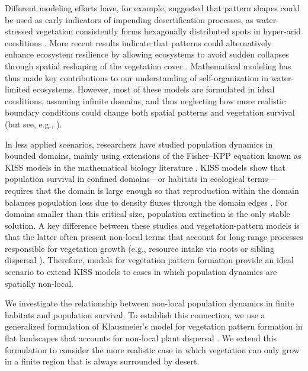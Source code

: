 \documentclass[preprint,12pt]{elsarticle}
\theoremstyle{plain}
\theoremstyle{definition}
\theoremstyle{remark}
\begin{document}
Different modeling efforts have, for example, suggested that pattern shapes could be used as early indicators of impending desertification processes, as water-stressed vegetation consistently forms hexagonally distributed spots in hyper-arid conditions \cite{Lefever1997,VonHardenberg2001,Meron2004,Rietkerk2002}. More recent results indicate that patterns could alternatively enhance ecosystem resilience by allowing ecosystems to avoid sudden collapses through spatial reshaping of the vegetation cover \cite{Rietkerk2021}. Mathematical modeling has thus made key contributions to our understanding of self-organization in water-limited ecosystems. However, most of these models are formulated in ideal conditions, assuming infinite domains, and thus neglecting how more realistic boundary conditions could change both spatial patterns and vegetation survival (but see, e.g., \cite{Clerc2021,PintoRamos2023,PintoRamos2025}).

In less applied scenarios, researchers have studied population dynamics in bounded domains, mainly using extensions of the Fisher–KPP equation \cite{Cantrell1999,Fagan2009,Colombo2018,Dornelas2024} known as KISS models in the mathematical biology literature \cite{Skellam1951,Kierstead1953}. KISS models show that population survival in confined domains---or habitats in ecological terms---requires that the domain is large enough so that reproduction within the domain balances population loss due to density fluxes through the domain edges \cite{Cantrell2004}. For domains smaller than this critical size, population extinction is the only stable solution. A key difference between these studies and vegetation-pattern models is that the latter often present non-local terms that account for long-range processes responsible for vegetation growth (e.g., resource intake via roots or sibling dispersal \cite{Martinez-Garcia2014,Eigentler2018}). Therefore, models for vegetation pattern formation provide an ideal scenario to extend KISS models to cases in which population dynamics are spatially non-local. 

We investigate the relationship between non-local population dynamics in finite habitats and population survival. To establish this connection, we use a generalized formulation of Klausmeier's model for vegetation pattern formation in flat landscapes that accounts for non-local plant dispersal \cite{Eigentler2018,Klausmeier1999}. We extend this formulation to consider the more realistic case in which vegetation can only grow in a finite region that is always surrounded by desert. 
\end{document}
